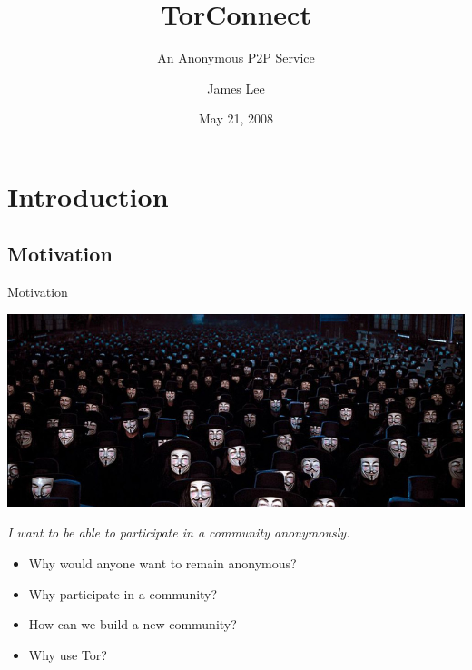 \documentclass{beamer}
\title{TorConnect}
\subtitle{An Anonymous P2P Service}
\author{James Lee}
\institute{University of Maryland, Baltimore County}
\date{May 21, 2008}
\begin{document}
\begin{frame}
\titlepage
\end{frame}

\section{Introduction}

\subsection{Motivation}
\begin{frame}{Motivation}
\begin{center}
\includegraphics[width=.9\textwidth]{vfv-crowd.jpg}
\end{center}

\emph{I want to be able to participate in a community anonymously.}

\begin{itemize}
\pause
\item Why would anyone want to remain anonymous?

\pause
\item Why participate in a community?

\pause
\item How can we build a new community?

\pause
\item Why use Tor?
\end{itemize}
\end{frame}
\end{document}
